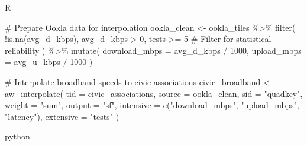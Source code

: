 \documentclass[
  letterpaper,
  DIV=11,
  numbers=noendperiod]{scrartcl}
\newenvironment{Shaded}{\begin{snugshade}}{\end{snugshade}}
\newcommand{\AttributeTok}[1]{\textcolor[rgb]{0.40,0.45,0.13}{#1}}
\newcommand{\CommentTok}[1]{\textcolor[rgb]{0.37,0.37,0.37}{#1}}
\newcommand{\DecValTok}[1]{\textcolor[rgb]{0.68,0.00,0.00}{#1}}
\newcommand{\FunctionTok}[1]{\textcolor[rgb]{0.28,0.35,0.67}{#1}}
\newcommand{\NormalTok}[1]{\textcolor[rgb]{0.00,0.23,0.31}{#1}}
\newcommand{\OtherTok}[1]{\textcolor[rgb]{0.00,0.23,0.31}{#1}}
\newcommand{\SpecialCharTok}[1]{\textcolor[rgb]{0.37,0.37,0.37}{#1}}
\newcommand{\StringTok}[1]{\textcolor[rgb]{0.13,0.47,0.30}{#1}}
\begin{document}
R

\begin{Shaded}
\begin{Highlighting}[]
\CommentTok{\# Prepare Ookla data for interpolation}
\NormalTok{ookla\_clean }\OtherTok{\textless{}{-}}\NormalTok{ ookla\_tiles }\SpecialCharTok{\%\textgreater{}\%}
  \FunctionTok{filter}\NormalTok{(}
    \SpecialCharTok{!}\FunctionTok{is.na}\NormalTok{(avg\_d\_kbps),}
\NormalTok{    avg\_d\_kbps }\SpecialCharTok{\textgreater{}} \DecValTok{0}\NormalTok{,}
\NormalTok{    tests }\SpecialCharTok{\textgreater{}=} \DecValTok{5}  \CommentTok{\# Filter for statistical reliability}
\NormalTok{  ) }\SpecialCharTok{\%\textgreater{}\%}
  \FunctionTok{mutate}\NormalTok{(}
    \AttributeTok{download\_mbps =}\NormalTok{ avg\_d\_kbps }\SpecialCharTok{/} \DecValTok{1000}\NormalTok{,}
    \AttributeTok{upload\_mbps =}\NormalTok{ avg\_u\_kbps }\SpecialCharTok{/} \DecValTok{1000}
\NormalTok{  )}

\CommentTok{\# Interpolate broadband speeds to civic associations}
\NormalTok{civic\_broadband }\OtherTok{\textless{}{-}} \FunctionTok{aw\_interpolate}\NormalTok{(}
  \AttributeTok{tid =}\NormalTok{ civic\_associations,}
  \AttributeTok{source =}\NormalTok{ ookla\_clean,}
  \AttributeTok{sid =} \StringTok{"quadkey"}\NormalTok{,}
  \AttributeTok{weight =} \StringTok{"sum"}\NormalTok{,}
  \AttributeTok{output =} \StringTok{"sf"}\NormalTok{,}
  \AttributeTok{intensive =} \FunctionTok{c}\NormalTok{(}\StringTok{"download\_mbps"}\NormalTok{, }\StringTok{"upload\_mbps"}\NormalTok{, }\StringTok{"latency"}\NormalTok{),}
  \AttributeTok{extensive =} \StringTok{"tests"}
\NormalTok{)}
\end{Highlighting}
\end{Shaded}

python
\end{document}
